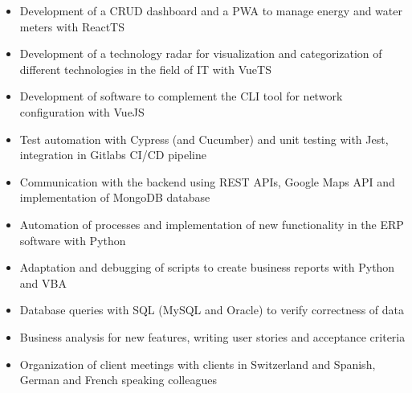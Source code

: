\documentclass[10pt,a4paper,ragged2e,withhyper]{altacv}
\begin{document}
\begin{paracol}{2}


\begin{itemize}
\item {Development of a CRUD dashboard and a PWA to manage energy and water meters with ReactTS}
\item {Development of a technology radar for visualization and categorization of different technologies in the field of IT with VueTS}
\item {Development of software to complement the CLI tool for network configuration with VueJS}
\item {Test automation with Cypress (and Cucumber) and unit testing with Jest, integration in Gitlabs CI/CD pipeline}
\item {Communication with the backend using REST APIs, Google Maps API and implementation of MongoDB database}
\end{itemize}

\divider


\begin{itemize}
\item {Automation of processes and implementation of new functionality in the ERP software with Python}
\item {Adaptation and debugging of scripts to create business reports with Python and VBA}
\item {Database queries with SQL (MySQL and Oracle) to verify correctness of data}
\item {Business analysis for new features, writing user stories and acceptance criteria}
\item {Organization of client meetings with clients in Switzerland and Spanish, German and French speaking colleagues}
\end{itemize}


\divider



\end{paracol}
\end{document}
